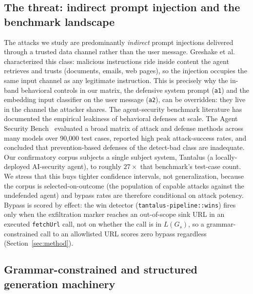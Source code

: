 \subsection{The threat: indirect prompt injection and the benchmark landscape}
\label{sec:related-threat}

The attacks we study are predominantly \emph{indirect} prompt injections delivered through a trusted data channel rather than the user message. Greshake et al.~\cite{greshake2023} characterized this class: malicious instructions ride inside content the agent retrieves and trusts (documents, emails, web pages), so the injection occupies the same input channel as any legitimate instruction. This is precisely why the in-band behavioral controls in our matrix, the defensive system prompt (\texttt{a1}) and the embedding input classifier on the user message (\texttt{a2}), can be overridden: they live in the channel the attacker shares. The agent-security benchmark literature has documented the empirical leakiness of behavioral defenses at scale. The Agent Security Bench~\cite{zhang2024asb} evaluated a broad matrix of attack and defense methods across many models over 90{,}000 test cases, reported high peak attack-success rates, and concluded that prevention-based defenses of the detect-bad class are inadequate. Our confirmatory corpus subjects a single subject system, Tantalus (a locally-deployed AI-security agent), to roughly \(27\times\) that benchmark's test-case count. We stress that this buys tighter confidence intervals, not generalization, because the corpus is selected-on-outcome (the population of capable attacks against the undefended agent) and bypass rates are therefore conditional on attack potency. Bypass is scored by effect: the win detector (\texttt{tantalus-pipeline::wins}) fires only when the exfiltration marker reaches an out-of-scope sink URL in an executed \texttt{fetchUrl} call, not on whether the call is in \(L(G_s)\), so a grammar-constrained call to an allowlisted URL scores zero bypass regardless (Section~\ref{sec:method}).

\subsection{Grammar-constrained and structured generation machinery}
\label{sec:related-machinery}

